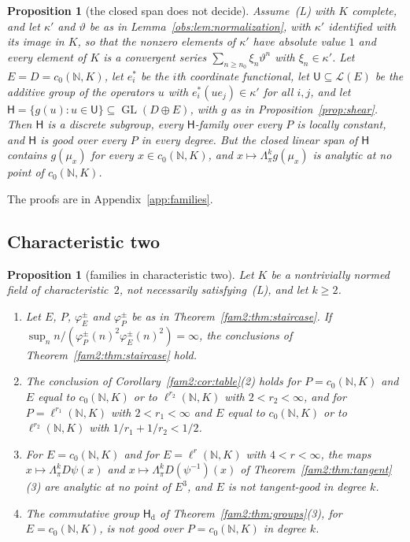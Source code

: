 \documentclass[11pt]{amsart}
\newtheorem{proposition}[theorem]{Proposition}
\theoremstyle{definition}
\theoremstyle{remark}
\numberwithin{equation}{section}
\newcommand{\N}{\mathbb N}
\newcommand{\cL}{\mathcal L}
\theoremstyle{plain}
\theoremstyle{definition}
\theoremstyle{plain}
\begin{document}
\begin{proposition}[the closed span does not decide]\label{fam2:prop:span}
Assume~\textup{(L)} with $K$ complete, and let $\kappa'$ and $\vartheta$ be as in Lemma~\ref{obs:lem:normalization}, with
$\kappa'$ identified with its image in $K$, so that the nonzero elements of $\kappa'$ have absolute value $1$ and every
element of $K$ is a convergent series $\sum_{n\ge n_0}\xi_n\vartheta^n$ with $\xi_n\in\kappa'$. Let $E=D=c_0(\N,K)$, let
$e^*_i$ be the $i$th coordinate functional, let $\mathsf U\subseteq\cL(E)$ be the additive group of the operators $u$ with
$e^*_i(ue_j)\in\kappa'$ for all $i,j$, and let $\mathsf H=\{g(u):u\in\mathsf U\}\subseteq\operatorname{GL}(D\oplus E)$, with
$g$ as in Proposition~\ref{prop:shear}. Then $\mathsf H$ is a discrete subgroup, every $\mathsf H$-family over every $P$ is
locally constant, and $\mathsf H$ is good over every $P$ in every degree. But the closed linear span of $\mathsf H$
contains $g(\mu_x)$ for every $x\in c_0(\N,K)$, and $x\mapsto\Lambda^k_\pi g(\mu_x)$ is analytic at no point of
$c_0(\N,K)$.
\end{proposition}

The proofs are in Appendix~\ref{app:families}.

\subsection{Characteristic two}\label{fam2:ssec:char-two}

\begin{proposition}[families in characteristic two]\label{fam2:prop:char-two}
Let $K$ be a nontrivially normed field of characteristic~$2$, not necessarily satisfying~\textup{(L)}, and let $k\ge2$.
\begin{enumerate}
\item Let $E$, $P$, $\varphi^\pm_E$ and $\varphi^\pm_P$ be as in Theorem~\ref{fam2:thm:staircase}. If
$\sup_nn/(\varphi^\pm_P(n)^2\varphi^\pm_E(n)^2)=\infty$, the conclusions of Theorem~\ref{fam2:thm:staircase} hold.
\item The conclusion of Corollary~\ref{fam2:cor:table}(2) holds for $P=c_0(\N,K)$ and $E$ equal to $c_0(\N,K)$ or to
$\ell^{r_2}(\N,K)$ with $2<r_2<\infty$, and for $P=\ell^{r_1}(\N,K)$ with $2<r_1<\infty$ and $E$ equal to $c_0(\N,K)$ or
to $\ell^{r_2}(\N,K)$ with $1/r_1+1/r_2<1/2$.
\item For $E=c_0(\N,K)$ and for $E=\ell^r(\N,K)$ with $4<r<\infty$, the maps $x\mapsto\Lambda^k_\pi D\psi(x)$ and
$x\mapsto\Lambda^k_\pi D(\psi^{-1})(x)$ of Theorem~\ref{fam2:thm:tangent}(3) are analytic at no point of $E^3$, and $E$
is not tangent-good in degree $k$.
\item The commutative group $\mathsf H_{\mathrm d}$ of Theorem~\ref{fam2:thm:groups}(3), for $E=c_0(\N,K)$, is not good
over $P=c_0(\N,K)$ in degree $k$.
\end{enumerate}
\end{proposition}
\end{document}
